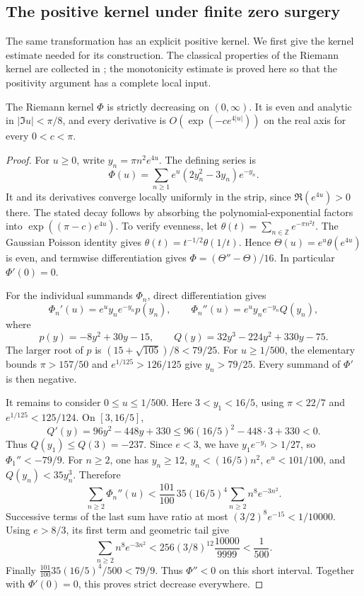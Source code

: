 \subsection{The positive kernel under finite zero surgery}
\label{sec:fd-positive-surgery}

The same transformation has an explicit positive kernel. We first
give the kernel estimate needed for its construction. The classical
properties of the Riemann kernel are collected in
\cite[Theorem~4.1, p.~10]{Csordas2015}; the monotonicity estimate is
proved here so that the positivity argument has a complete local input.

\begin{lemma}
\label{lem:fd-kernel-decreasing}
The Riemann kernel \(\Phi\) is strictly decreasing on \((0,\infty)\).
It is even and analytic in \(|\Im u|<\pi/8\), and every derivative
is \(O(\exp(-c e^{4|u|}))\) on the real axis for every \(0<c<\pi\).
\end{lemma}

\begin{proof}
For \(u\ge0\), write \(y_n=\pi n^2e^{4u}\). The defining series is
\[
 \Phi(u)=\sum_{n\ge1}e^u(2y_n^2-3y_n)e^{-y_n}.
\]
It and its derivatives converge locally uniformly in the strip,
since \(\Re(e^{4u})>0\) there. The stated decay follows by
absorbing the polynomial-exponential factors into
\(\exp((\pi-c)e^{4u})\). To verify evenness, let
\(\theta(t)=\sum_{n\in\mathbb Z}e^{-\pi n^2t}\).
The Gaussian Poisson identity gives
\(\theta(t)=t^{-1/2}\theta(1/t)\). Hence
\(\Theta(u)=e^u\theta(e^{4u})\) is even, and termwise
differentiation gives
\(\Phi=(\Theta''-\Theta)/16\). In particular \(\Phi'(0)=0\).

For the individual summands \(\Phi_n\), direct differentiation gives
\[
 \Phi_n'(u)=e^u y_ne^{-y_n}p(y_n),\qquad
 \Phi_n''(u)=e^u y_ne^{-y_n}Q(y_n),
\]
where
\[
 p(y)=-8y^2+30y-15,\qquad
 Q(y)=32y^3-224y^2+330y-75.
\]
The larger root of \(p\) is
\((15+\sqrt{105})/8<79/25\).
For \(u\ge1/500\), the elementary bounds
\(\pi>157/50\) and \(e^{1/125}>126/125\) give
\(y_n>79/25\). Every summand of \(\Phi'\) is then negative.

It remains to consider \(0\le u\le1/500\).
Here \(3<y_1<16/5\), using \(\pi<22/7\) and
\(e^{1/125}<125/124\).
On \([3,16/5]\),
\[
 Q'(y)=96y^2-448y+330
 \le96(16/5)^2-448\cdot3+330<0.
\]
Thus \(Q(y_1)\le Q(3)=-237\).
Since \(e<3\), we have \(y_1e^{-y_1}>1/27\), so
\(\Phi_1''<-79/9\).
For \(n\ge2\), one has \(y_n\ge12\),
\(y_n<(16/5)n^2\), \(e^u<101/100\), and
\(Q(y_n)<35y_n^3\). Therefore
\[
 \sum_{n\ge2}\Phi_n''(u)
 <\frac{101}{100}\,35(16/5)^4
                 \sum_{n\ge2}n^8e^{-3n^2}.
\]
Successive terms of the last sum have ratio at most
\((3/2)^8e^{-15}<1/10000\). Using \(e>8/3\), its first term
and geometric tail give
\[
 \sum_{n\ge2}n^8e^{-3n^2}
 <256(3/8)^{12}\frac{10000}{9999}<\frac1{500}.
\]
Finally
\(\frac{101}{100}35(16/5)^4/500<79/9\).
Thus \(\Phi''<0\) on this short interval.
Together with \(\Phi'(0)=0\), this proves strict decrease everywhere.
\end{proof}

